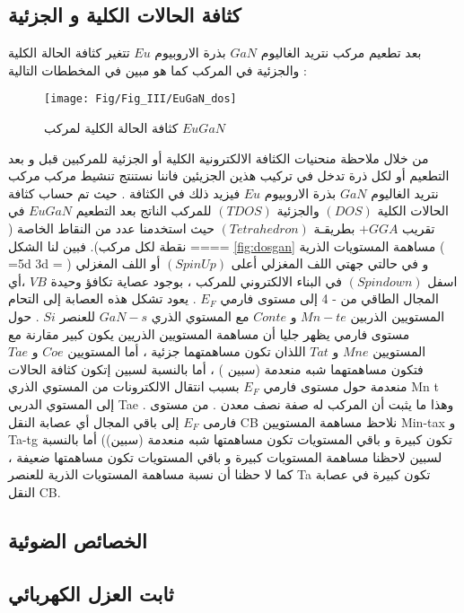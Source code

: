 \subsection*{كثافة الحالات الكلية و الجزئية}

بعد تطعيم مركب نتريد الغاليوم $ GaN $ بذرة الاروبيوم $ Eu $ تتغير كثافة الحالة الكلية والجزئية في المركب كما هو مبين في المخططات التالية :

\begin{figure}[h!]
	\centering
	\texttt{[image: Fig/Fig\_III/EuGaN\_dos]}
	\caption{ كثافة الحالة الكلية لمركب $  EuGaN $}
	\label{fig:eugandos}
\end{figure}
\FloatBarrier

من خلال ملاحظة منحنيات الكثافة الالكترونية الكلية أو الجزئية للمركبين قبل و بعد التطعيم أو لكل ذرة تدخل في تركيب هذين الجزيئين  فاننا نستنتج تنشيط مركب مركب نتريد الغاليوم $ GaN $ بذرة الاروبيوم $ Eu $ فيزيد ذلك في الكثافة .
حيث تم حساب كثافة الحالات الكلية $ ( DOS) $ والجزئية $ (TDOS) $ للمركب الناتج بعد التطعيم $ EuGaN $  في تقريب $ +GGA  $ بطريقـة $ ( Tetrahedron ) $ حيث استخدمنا عدد من النقاط الخاصة ( ==== نقطة لكل مركب). فبين لنا الشكل \ref{fig:dosgan} مساهمة المستويات الذرية ( =5d 3d = ) و في حالتي جهتي اللف المغزلي أعلى $ ( Spin Up ) $ أو اللف المغزلي اسفل $ ( Spin down ) $ في البناء الالكتروني للمركب ، بوجود عصاية تكافؤ وحيدة $ VB $ ،أي المجال الطاقي من - 4 إلى مستوى فارمي $ E_{F} $ . يعود تشكل هذه العصابة إلى التحام المستويين الذربين $ Mn-te $ و $ Conte $ مع المستوي الذري $ GaN-s  $ للعنصر $ Si $ . حول مستوى فارمي يظهر جليا أن مساهمة المستويين الذريين  يكون كبير مقارنة مع المستويين $ Mne $ و $ Tat $ اللذان تكون مساهمتهما جزئية ، أما المستويين $ Coe $ و $ Tae $ فتكون مساهمتهما شبه منعدمة (سبين ) ، أما بالنسبة لسبين إتكون كثافة الحالات منعدمة حول مستوى فارمي $ E_{F} $ بسبب انتقال الالكترونات من المستوي الذري Mn t إلى المستوي الدربي Tae . وهذا ما يثبت أن المركب له صفة نصف معدن . من مستوى فارمی $ E_{F} $ إلى باقي المجال أي عصابة النقل CB نلاحظ مساهمة المستويين Min-tax و Ta-tg تكون كبيرة و باقي المستويات تكون مساهمتها شبه منعدمة (سبين)) أما بالنسبة لسبين لاحظنا مساهمة المستويات كبيرة و باقي المستويات تكون مساهمتها ضعيفة ، كما لا حظنا أن نسبة مساهمة المستويات الذرية للعنصر Ta تكون كبيرة في عصابة النقل CB.

\subsection{الخصائص الضوئية}

\subsection*{ثابت العزل الكهربائي }

